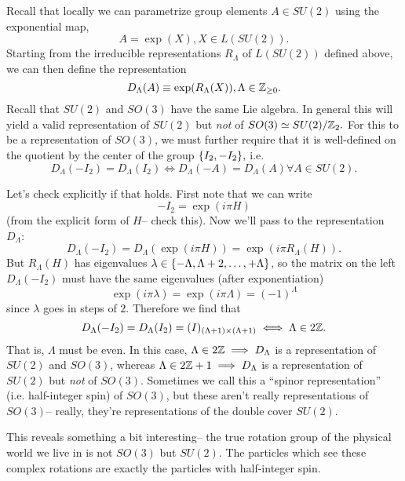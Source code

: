 Recall that locally we can parametrize group elements $A\in SU(2)$ using the exponential map,
$$A=\exp(X), X\in L(SU(2)).$$
Starting from the irreducible representations $R_\Lambda$ of $L(SU(2))$ defined above, we can then define the representation
$$D_\Lambda(A)\equiv \exp (R_\Lambda(X)), \Lambda \in \mathbb{Z}_{\geq 0}.$$
Recall that $SU(2)$ and $SO(3)$ have the same Lie algebra. In general this will yield a valid representation of $SU(2)$ but \emph{not} of $SO(3)\simeq SU(2)/\mathbb{Z}_2.$ For this to be a representation of $SO(3)$, we must further require that it is well-defined on the quotient by the center of the group $\{I_2,-I_2\},$ i.e.
$$D_\Lambda(-I_2)=D_\Lambda(I_2) \iff D_\Lambda(-A)=D_\Lambda(A) \forall A\in SU(2).$$

Let's check explicitly if that holds. First note that we can write
$$-I_2 = \exp (i \pi H)$$
(from the explicit form of $H$-- check this). Now we'll pass to the representation $D_\Lambda$:
$$D_\Lambda(-I_2)=D_\Lambda(\exp(i\pi H)) = \exp(i\pi R_\Lambda(H)).$$
But $R_\Lambda(H)$ has eigenvalues $\lambda\in\{-\Lambda,\Lambda+2,\ldots,+\Lambda\}$, so the matrix on the left $D_\Lambda(-I_2)$ must have the same eigenvalues (after exponentiation) $$\exp(i\pi \lambda)= \exp(i\pi \Lambda)=(-1)^\Lambda$$ since $\lambda$ goes in steps of $2$.
Therefore we find that
$$D_\Lambda(-I_2)=D_\Lambda(I_2)=(I)_{(\Lambda+1)\times (\Lambda+1)}\iff \Lambda \in 2\mathbb{Z}.$$
That is, $\Lambda$ must be even. In this case,
$\Lambda \in 2 \mathbb{Z} \implies D_\Lambda$ is a representation of $SU(2)$ and $SO(3)$, whereas $\Lambda \in 2 \mathbb{Z}+1 \implies D_\Lambda$ is a representation of $SU(2)$ but \emph{not} of $SO(3)$. Sometimes we call this a ``spinor representation'' (i.e. half-integer spin) of $SO(3)$, but these aren't really representations of $SO(3)$-- really, they're representations of the double cover $SU(2)$.

This reveals something a bit interesting-- the true rotation group of the physical world we live in is not $SO(3)$ but $SU(2)$. The particles which see these complex rotations are exactly the particles with half-integer spin.

